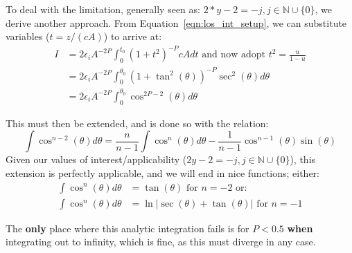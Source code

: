\documentclass[twocolumn,traditabstract]{aa}
\begin{document}
To deal with the limitation, generally seen as: $2*y-2 = -j, j \in \mathbb{N} \cup \{0\}$, we derive another approach.
From Equation~\ref{eqn:los_int_setup}, we can substitute variables ($t = z / (cA)$) to arrive at:
\begin{align}
  I &= 2 \epsilon_i A^{-2P} \int_{0}^{t_0}(1+t^2)^{-P} c A dt \text{ and now adopt } t^2 = \frac{u}{1-u} \\
    &= 2 \epsilon_i A^{-2P} \int_{0}^{\theta_0}(1+\tan^2(\theta))^{-P} \sec^2(\theta) d\theta \\
    &= 2 \epsilon_i A^{-2P} \int_{0}^{\theta_0}\cos^{2P-2}(\theta) d\theta
\end{align}

This must then be extended, and is done so with the relation:
\begin{equation}
  \int \cos^{n-2}(\theta) d\theta = \frac{n}{n-1}\int \cos^n(\theta)d\theta - \frac{1}{n-1}\cos^{n-1}(\theta)\sin(\theta) 
  \label{eqn:cosext}
\end{equation}
Given our values of interest/applicability ($2y-2 = -j, j \in \mathbb{N} \cup \{0\}$), this extension is perfectly
applicable, and we will end in nice functions; either:
\begin{align*}
  \int \cos^n(\theta)d\theta &= \tan(\theta) \text{ for } n=-2 \text{ or: } \\
  \int \cos^n(\theta)d\theta &= \ln \vert \sec(\theta) + \tan(\theta) \vert \text{ for } n=-1
\end{align*}

The \textbf{only} place where this analytic integration fails is for $P < 0.5$ \textbf{when} integrating out to infinity,
which is fine, as this must diverge in any case. 





%

\label{references}
\end{document}
